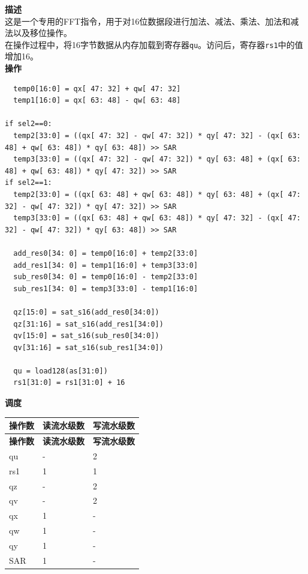 \textbf{描述}\\
这是一个专用的FFT指令，用于对16位数据段进行加法、减法、乘法、加法和减法以及移位操作。\\
在操作过程中，将16字节数据从内存加载到寄存器\lstinline{qu}。访问后，寄存器\lstinline{rs1}中的值增加16。\\
\textbf{操作}

\begin{lstlisting}
  temp0[16:0] = qx[ 47: 32] + qw[ 47: 32]
  temp1[16:0] = qx[ 63: 48] - qw[ 63: 48]

if sel2==0:
  temp2[33:0] = ((qx[ 47: 32] - qw[ 47: 32]) * qy[ 47: 32] - (qx[ 63: 48] + qw[ 63: 48]) * qy[ 63: 48]) >> SAR
  temp3[33:0] = ((qx[ 47: 32] - qw[ 47: 32]) * qy[ 63: 48] + (qx[ 63: 48] + qw[ 63: 48]) * qy[ 47: 32]) >> SAR
if sel2==1:
  temp2[33:0] = ((qx[ 63: 48] + qw[ 63: 48]) * qy[ 63: 48] + (qx[ 47: 32] - qw[ 47: 32]) * qy[ 47: 32]) >> SAR
  temp3[33:0] = ((qx[ 63: 48] + qw[ 63: 48]) * qy[ 47: 32] - (qx[ 47: 32] - qw[ 47: 32]) * qy[ 63: 48]) >> SAR

  add_res0[34: 0] = temp0[16:0] + temp2[33:0]
  add_res1[34: 0] = temp1[16:0] + temp3[33:0]
  sub_res0[34: 0] = temp0[16:0] - temp2[33:0]
  sub_res1[34: 0] = temp3[33:0] - temp1[16:0]

  qz[15:0] = sat_s16(add_res0[34:0])
  qz[31:16] = sat_s16(add_res1[34:0])
  qv[15:0] = sat_s16(sub_res0[34:0])
  qv[31:16] = sat_s16(sub_res1[34:0])

  qu = load128(as[31:0])
  rs1[31:0] = rs1[31:0] + 16
\end{lstlisting}

\textbf{调度}\\
\begin{longtable}[c]{|l|l|l|}
    \hline
    \rowcolor{lightgray}
    \textbf{操作数} & \textbf{读流水级数} & \textbf{写流水级数} \\\hline
    \endfirsthead
    \hline
    \rowcolor{lightgray}
     \textbf{操作数} & \textbf{读流水级数} & \textbf{写流水级数} \\\hline
    \endhead
    \hline
    \endfoot

  qu & - & 2 \\\hline
  rs1 & 1 & 1 \\\hline
  qz & - & 2 \\\hline
  qv & - & 2 \\\hline
  qx & 1 & - \\\hline
  qw & 1 & - \\\hline
  qy & 1 & - \\\hline
  SAR & 1 & -

\end{longtable}

